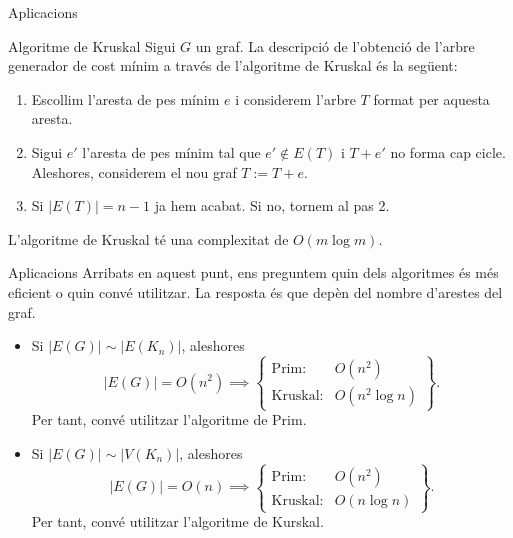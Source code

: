 \documentclass{beamer}
\begin{document}
\begin{frame}{Aplicacions}
    \begin{alertblock}{Algoritme de Kruskal}
        Sigui $G$ un graf. La descripció de l'obtenció de l'arbre generador de cost mínim a través de l'algoritme de Kruskal és la següent:
        \begin{enumerate}
            \item Escollim l'aresta de pes mínim $e$ i considerem l'arbre $T$ format per aquesta aresta.\pause
            \item Sigui $e'$ l’aresta de pes mínim tal que $e'\notin E(T)$ i $T+e'$ no forma cap cicle. Aleshores, considerem el nou graf $T:=T+e$.\pause
            \item Si $|E(T)|=n-1$ ja hem acabat. Si no, tornem al pas 2.
        \end{enumerate}
    \end{alertblock}\pause
    L’algoritme de Kruskal té una complexitat de $O(m\log m)$.
\end{frame}
\begin{frame}{Aplicacions}
    Arribats en aquest punt, ens preguntem quin dels algoritmes és més eficient o quin convé utilitzar. \pause La resposta és que depèn del nombre d’arestes del graf.\pause
    \begin{itemize}
        \item<3-> Si $|E(G)|\sim |E(K_n)|$, aleshores $$|E(G)|= O(n^2)\implies\left\{\begin{array}{cc}
                      \text{Prim:}    & O(n^2)       \\
                      \text{Kruskal:} & O(n^2\log n)
                  \end{array}\right\}.$$\pause Per tant, convé utilitzar l'algoritme de Prim.\pause
        \item<4-> Si $|E(G)|\sim |V(K_n)|$, aleshores $$|E(G)|= O(n)\implies\left\{\begin{array}{cc}
                      \text{Prim:}    & O(n^2)     \\
                      \text{Kruskal:} & O(n\log n)
                  \end{array}\right\}.$$\pause Per tant, convé utilitzar l'algoritme de Kurskal.
    \end{itemize}
\end{frame}
\end{document}
